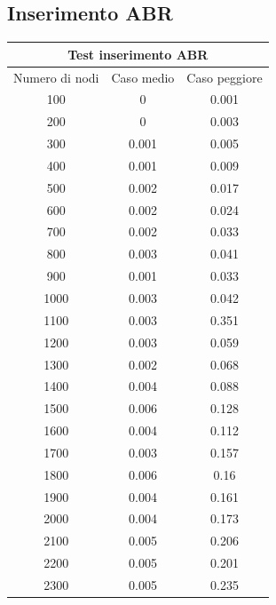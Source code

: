 \documentclass{article}
\begin{document}
\subsection{Inserimento ABR}
{\centering}
{\renewcommand{\arraystretch}{0.9}}
\begin{longtable}{c|c|c}
\hline
\multicolumn{3}{c}{Test inserimento ABR}\\
\hline
   Numero di nodi &   Caso medio &   Caso peggiore \\
\hline
              100 &        0     &           0.001 \\
              200 &        0     &           0.003 \\
              300 &        0.001 &           0.005 \\
              400 &        0.001 &           0.009 \\
              500 &        0.002 &           0.017 \\
              600 &        0.002 &           0.024 \\
              700 &        0.002 &           0.033 \\
              800 &        0.003 &           0.041 \\
              900 &        0.001 &           0.033 \\
             1000 &        0.003 &           0.042 \\
             1100 &        0.003 &           0.351 \\
             1200 &        0.003 &           0.059 \\
             1300 &        0.002 &           0.068 \\
             1400 &        0.004 &           0.088 \\
             1500 &        0.006 &           0.128 \\
             1600 &        0.004 &           0.112 \\
             1700 &        0.003 &           0.157 \\
             1800 &        0.006 &           0.16  \\
             1900 &        0.004 &           0.161 \\
             2000 &        0.004 &           0.173 \\
             2100 &        0.005 &           0.206 \\
             2200 &        0.005 &           0.201 \\
             2300 &        0.005 &           0.235 \\

\end{longtable}
\end{document}
